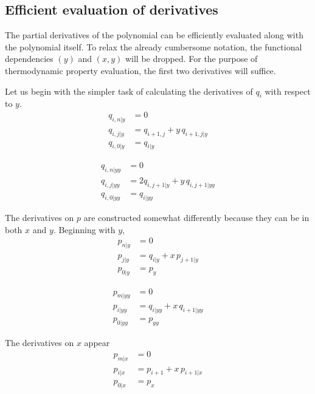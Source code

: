 \subsection{Efficient evaluation of derivatives}

The partial derivatives of the polynomial can be efficiently evaluated along with the polynomial itself. To relax the already cumbersome notation, the functional dependencies $(y)$ and $(x,y)$ will be dropped.  For the purpose of thermodynamic property evaluation, the first two derivatives will suffice.

Let us begin with the simpler task of calculating the derivatives of $q_i$ with respect to $y$.
\begin{subequations}
\begin{align}
q_{i,n|y} &= 0\\
q_{i,j|y} &= q_{i+1,j} + y\,q_{i+1,j|y}\\
q_{i,0|y} &= q_{i|y}
\end{align}
\end{subequations}

\begin{subequations}
\begin{align}
q_{i,n|yy} &= 0\\
q_{i,j|yy} &= 2 q_{i,j+1|y} + y\,q_{i,j+1|yy}\\
q_{i,0|yy} &= q_{i|yy}
\end{align}
\end{subequations}

The derivatives on $p$ are constructed somewhat differently because they can be in both $x$ and $y$.  Beginning with $y$,
\begin{subequations}
\begin{align}
p_{n|y} &= 0\\
p_{j|y} &= q_{i|y} + x\,p_{j+1|y}\\
p_{0|y} &= p_y
\end{align}
\end{subequations}

\begin{subequations}
\begin{align}
p_{m|yy} &= 0\\
p_{i|yy} &= q_{i|yy} + x\,q_{i+1|yy}\\
p_{0|yy} &= p_{yy}
\end{align}
\end{subequations}

The derivatives on $x$ appear
\begin{subequations}
\begin{align}
p_{m|x} &= 0\\
p_{i|x} &= p_{i+1} + x\,p_{i+1|x}\\
p_{0|x} &= p_x
\end{align}
\end{subequations}

